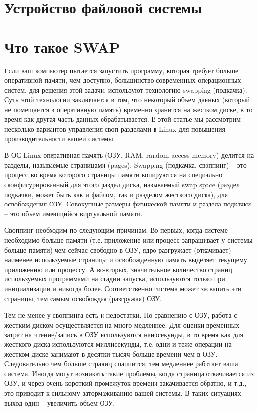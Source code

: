 \section{Устройство файловой системы}

\section{Что такое SWAP}
Если ваш компьютер пытается запустить программу, которая требует больше оперативной памяти, чем доступно, большинство современных операционных систем, для решения этой задачи, используют технологию swapping (подкачка). Суть этой технологии заключается в том, что некоторый объем данных (который не помещается в оперативную память) временно хранится на жестком диске, в то время как другая часть данных обрабатывается. В этой статье мы рассмотрим несколько вариантов управления своп-разделами в Linux для повышения производительности вашей системы.

В ОС Linux оперативная память (ОЗУ, RAM, random access memory) делится на разделы, называемые страницами (pages). Swapping (подкачка, своппинг) – это процесс во время которого страницы памяти копируются на специально сконфигурированный для этого раздел диска, называемый swap space (раздел подкачки, может быть как и файлом, так и разделом жесткого диска), для освобождения ОЗУ. Совокупные размеры физической памяти и раздела подкачки – это объем имеющийся виртуальной памяти.

Своппинг необходим по следующим причинам. Во-первых, когда системе необходимо больше памяти (т.е. приложение или процесс запрашивает у системы больше памяти) чем сейчас свободно в ОЗУ, ядро разгружает (откачивает) наименее используемые страницы и освобожденную память выделяет текущему приложению или процессу. А во-вторых, значительное количество страниц используемых программами на стадии запуска, используются только при инициализации и никогда более. Соответственно система может засвапить эти страницы, тем самым освобождая (разгружая) ОЗУ.

Тем не менее у своппинга есть и недостатки. По сравнению с ОЗУ, работа с жестким диском осуществляется на много медленнее. Для оценки временных затрат на чтение/запись в ОЗУ используются наносекунды, в то время как для жесткого диска используются миллисекунды, т.е. одни и теже операции на жестком диске занимают в десятки тысяч больше времени чем в ОЗУ. Следовательно чем больше страниц спаппится, тем медленнее работает ваша система. Иногда могут возникать такие проблемы, когда страница откачивается из ОЗУ, и через очень короткий промежуток времени закачивается обратно, и т.д., это приводит к сильному затормаживанию вашей системы. В таких ситуациях выход один – увеличить объем ОЗУ.

